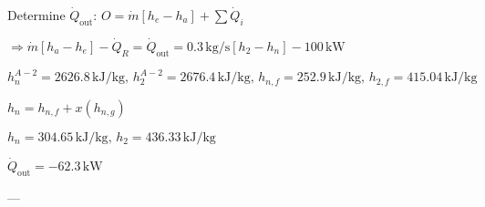 Determine \( \dot{Q}_{\text{out}} \):  
\( O = \dot{m} [h_e - h_a] + \sum \dot{Q}_i \)  

\( \Rightarrow \dot{m} [h_a - h_e] - \dot{Q}_R = \dot{Q}_{\text{out}} = 0.3 \, \text{kg/s} [h_2 - h_n] - 100 \, \text{kW} \)  

\( h_n^{A-2} = 2626.8 \, \text{kJ/kg}, \, h_2^{A-2} = 2676.4 \, \text{kJ/kg}, \, h_{n,f} = 252.9 \, \text{kJ/kg}, \, h_{2,f} = 415.04 \, \text{kJ/kg} \)  

\( h_n = h_{n,f} + x(h_{n,g}) \)  

\( h_n = 304.65 \, \text{kJ/kg}, \, h_2 = 436.33 \, \text{kJ/kg} \)  

\( \dot{Q}_{\text{out}} = -62.3 \, \text{kW} \)  

---